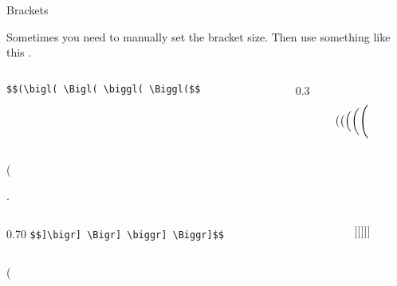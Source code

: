 \begin{frame}[fragile]{Brackets\magicPage}\relax

Sometimes you need to manually set the bracket size. Then use something like this 
\vphantom. 
    \begin{columns}
        \begin{column}{0.70\textwidth}
          \hfill \lstinline[basicstyle=\tt\normalsize]"$$(\bigl( \Bigl( \biggl( \Biggl($$" 
        \end{column}
        \begin{column}{0.3\textwidth}
             $$(\bigl( \Bigl( \biggl( \Biggl($$
        \end{column}
    \end{columns}
    \vphantom(
    
    \vphantom. 
    \begin{columns}
        \begin{column}{0.70\textwidth}
          \hfill \lstinline[basicstyle=\tt\normalsize]"$$]\bigr] \Bigr] \biggr] \Biggr]$$" 
        \end{column}
        \begin{column}{0.3\textwidth}
             $$]\bigr] \Bigr] \biggr] \Biggr]$$
        \end{column}
    \end{columns}
    \vphantom(

     
\end{frame}